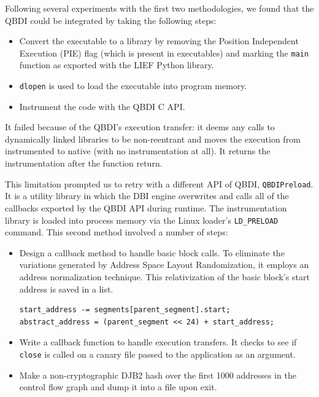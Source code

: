 \documentclass[../main.tex]{subfiles}
\begin{document}
Following several experiments with the first two methodologies, we found
that the QBDI could be integrated by taking the following steps:

\begin{itemize}
\tightlist
\item
  Convert the executable to a library by removing the Position Independent Execution (PIE) flag (which is
  present in executables) and marking the \texttt{main} function as
  exported with the LIEF Python library.
\item
  \texttt{dlopen} is used to load the executable into program memory.
\item
  Instrument the code with the QBDI C API.
\end{itemize}

It failed because of the QBDI's execution transfer: it deems any calls
to dynamically linked libraries to be non-reentrant and moves the
execution from instrumented to native (with no instrumentation at all).
It returns the instrumentation after the function return.

This limitation prompted us to retry with a different API of QBDI,
\texttt{QBDIPreload}. It is a utility library in which the DBI engine
overwrites and calls all of the callbacks exported by the QBDI API
during runtime. The instrumentation library is loaded into process
memory via the Linux loader's \texttt{LD\_PRELOAD} command. This second
method involved a number of steps:

\begin{itemize}
\item
  Design a callback method to handle basic block calls. To eliminate the
  variations generated by Address Space Layout Randomization, it employs
  an address normalization technique. This relativization of the basic
  block's start address is saved in a list.

\begin{tiny}
\begin{verbatim}
start_address -= segments[parent_segment].start;
abstract_address = (parent_segment << 24) + start_address;
\end{verbatim}
\end{tiny}

\item
  Write a callback function to handle execution transfers. It checks to
  see if \texttt{close} is called on a canary file passed to the
  application as an argument.
\item
  Make a non-cryptographic DJB2 hash over the first 1000 addresses in
  the control flow graph and dump it into a file upon exit.
\end{itemize}
\end{document}
